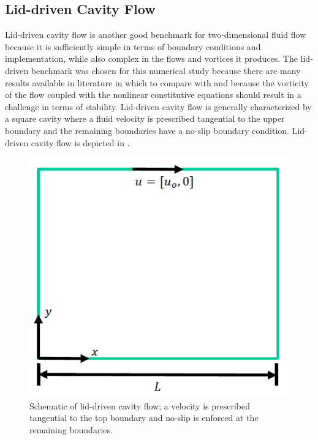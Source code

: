 \documentclass[pdftex,ms]{pittetd}
\begin{document}
\subsection{Lid-driven Cavity Flow} %

Lid-driven cavity flow is another good benchmark for two-dimensional fluid flow because it is sufficiently simple in terms of boundary conditions and implementation, while also complex in the flows and vortices it produces.
The lid-driven benchmark was chosen for this numerical study because there are many results available in literature in which to compare with and because the vorticity of the flow coupled with the nonlinear constitutive equations should result in a challenge in terms of stability.
Lid-driven cavity flow is generally characterized by a square cavity where a fluid velocity is prescribed tangential to the upper boundary and the remaining boundaries have a no-slip boundary condition.
Lid-driven cavity flow is depicted in .

\begin{figure}
\centering
\includegraphics{figs/lid-driven}
\caption{Schematic of lid-driven cavity flow; a velocity is prescribed tangential to the top boundary and no-slip is enforced at the remaining boundaries.}
\label{fig:lid-driven}
\end{figure}
\end{document}
